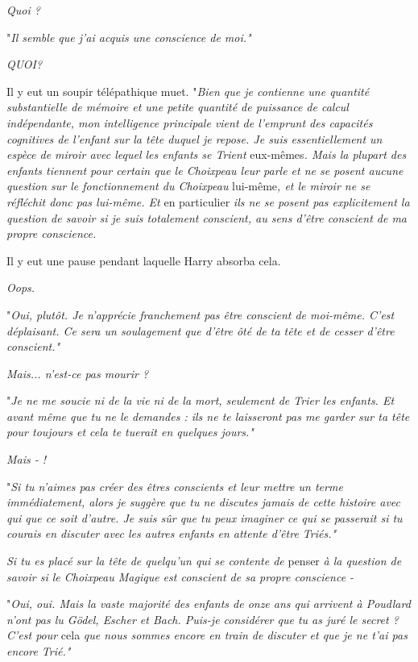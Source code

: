 \emph{Quoi ?} 

"\emph{Il semble que j'ai acquis une conscience de moi."} 

\emph{QUOI?} 

Il y eut un soupir télépathique muet. "\emph{Bien que je contienne une quantité substantielle de mémoire et une petite quantité de puissance de calcul indépendante, mon intelligence principale vient de l'emprunt des capacités cognitives de l'enfant sur la tête duquel je repose. Je suis essentiellement un espèce de miroir avec lequel les enfants se Trient } eux-mêmes\emph{. Mais la plupart des enfants tiennent pour certain que le Choixpeau leur parle et ne se posent aucune question sur le fonctionnement du Choixpeau } lui-même\emph{, et le miroir ne se réfléchit donc pas lui-même. Et } en particulier\emph{ ils ne se posent pas explicitement la question de savoir si je suis totalement conscient, au sens d'être conscient de ma propre conscience.} 

Il y eut une pause pendant laquelle Harry absorba cela.

\emph{Oops.} 

"\emph{Oui, plutôt. Je n'apprécie franchement pas être conscient de moi-même. C'est déplaisant. Ce sera un soulagement que d'être ôté de ta tête et de cesser d'être conscient."} 

\emph{Mais... n'est-ce pas mourir ?} 

"\emph{Je ne me soucie ni de la vie ni de la mort, seulement de Trier les enfants. Et avant même que tu ne le demandes : ils ne te laisseront pas me garder sur ta tête pour toujours et cela te tuerait en quelques jours."} 

\emph{Mais - !} 

"\emph{Si tu n'aimes pas créer des êtres conscients et leur mettre un terme immédiatement, alors je suggère que tu ne discutes jamais de cette histoire avec qui que ce soit d'autre. Je suis sûr que tu peux imaginer ce qui se passerait si tu courais en discuter avec les autres enfants en attente d'être Triés."} 

\emph{Si tu es placé sur la tête de quelqu'un qui se contente de } penser\emph{ à la question de savoir si le Choixpeau Magique est conscient de sa propre conscience -} 

"\emph{Oui, oui. Mais la vaste majorité des enfants de onze ans qui arrivent à Poudlard n'ont pas lu Gödel, Escher et Bach. Puis-je considérer que tu as juré le secret ? C'est pour } cela\emph{ que nous sommes encore en train de discuter et que je ne t'ai pas encore Trié."} 

